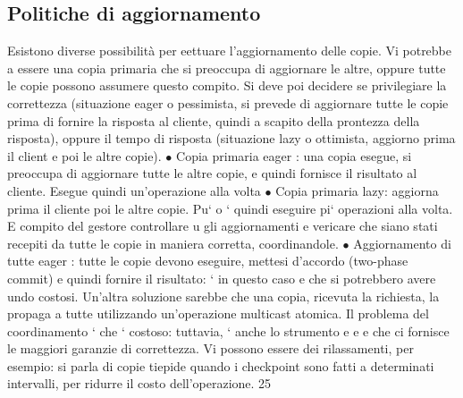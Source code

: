 \documentclass[a4paper,12pt]{article}
\begin{document}
\subsection{Politiche di aggiornamento}
Esistono diverse possibilità per eettuare l'aggiornamento delle copie. Vi potrebbe
a
essere una copia primaria che si preoccupa di aggiornare le altre, oppure tutte
le copie possono assumere questo compito. Si deve poi decidere se privilegiare
la correttezza (situazione eager o pessimista, si prevede di aggiornare tutte le
copie prima di fornire la risposta al cliente, quindi a scapito della prontezza della risposta), oppure il tempo di
risposta (situazione lazy o ottimista, aggiorno
prima il client e poi le altre copie).
$\bullet$ Copia primaria eager : una copia esegue, si preoccupa di aggiornare tutte
le altre copie, e quindi fornisce il risultato al cliente. Esegue quindi
un'operazione alla volta
$\bullet$ Copia primaria lazy: aggiorna prima il cliente poi le altre copie. Pu`
o
`
quindi eseguire pi` operazioni alla volta. E compito del gestore controllare
u
gli aggiornamenti e vericare che siano stati recepiti da tutte le copie in
maniera corretta, coordinandole.
$\bullet$ Aggiornamento di tutte eager : tutte le copie devono eseguire, mettesi d'accordo (two-phase commit) e quindi
fornire il risultato: ` in questo caso
e
che si potrebbero avere undo costosi. Un'altra soluzione sarebbe che una
copia, ricevuta la richiesta, la propaga a tutte utilizzando un'operazione
multicast atomica.
Il problema del coordinamento ` che ` costoso: tuttavia, ` anche lo strumento
e
e
e
che ci fornisce le maggiori garanzie di correttezza. Vi possono essere dei rilassamenti, per esempio: si parla di copie
tiepide quando i checkpoint sono fatti a
determinati intervalli, per ridurre il costo dell'operazione.
25
\end{document}
